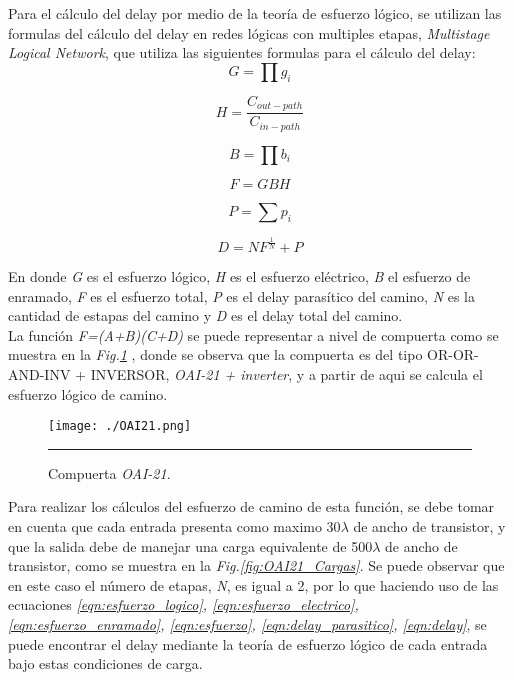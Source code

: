 \documentclass[12pt,a4paper]{article} %
\begin{document}
Para el cálculo del delay por medio de la teoría de esfuerzo lógico, se utilizan las formulas del cálculo del delay en redes lógicas con multiples etapas, \textit{Multistage Logical Network}, que utiliza las siguientes formulas para el cálculo del delay:\\

\begin{equation}\label{eqn:esfuerzo_logico}
G= \prod g_{i}
\end{equation}

\begin{equation}\label{eqn:esfuerzo_electrico}
H= \frac{C_{out-path}}{C_{in-path}}
\end{equation}

\begin{equation}\label{eqn:esfuerzo_enramado}
B= \prod b_{i}
\end{equation}

\begin{equation}\label{eqn:esfuerzo}
F = GBH
\end{equation}

\begin{equation}\label{eqn:delay_parasitico}
P = \sum p_{i}
\end{equation}

\begin{equation}\label{eqn:delay}
D = NF^{\frac{1}{N}} + P
\end{equation}

En donde \textit{G} es el esfuerzo lógico, \textit{H} es el esfuerzo eléctrico, \textit{B} el esfuerzo de enramado, \textit{F} es el esfuerzo total, \textit{P} es el delay parasítico del camino, \textit{N} es la cantidad de estapas del camino y \textit{D} es el delay total del camino.\\

La función \textit{F=(A+B)(C+D)} se puede representar a nivel de compuerta como se muestra en la \textit{Fig.\ref{fig:OAI21}} , donde se observa que la compuerta es del tipo OR-OR-AND-INV + INVERSOR, \textit{OAI-21 + inverter}, y a partir de aqui se calcula el esfuerzo lógico de camino.\\

\begin{figure}[htbp]
  \centering
    \texttt{[image: ./OAI21.png]}
    \rule{35em}{0.5pt}
  \caption[IdealvsSim]{Compuerta \textit{OAI-21}.}
  \label{fig:OAI21}
\end{figure}

Para realizar los cálculos del esfuerzo de camino de esta función, se debe tomar en cuenta que cada entrada presenta como maximo 30$\lambda$ de ancho de transistor, y que la salida debe de manejar una carga equivalente de 500$\lambda$ de ancho de transistor, como se muestra en la \textit{Fig.\ref{fig:OAI21_Cargas}}. Se puede observar que en este caso el número de etapas, \textit{N}, es igual a 2, por lo que haciendo uso de las ecuaciones \textit{\ref{eqn:esfuerzo_logico}, \ref{eqn:esfuerzo_electrico}, \ref{eqn:esfuerzo_enramado}, \ref{eqn:esfuerzo}, \ref{eqn:delay_parasitico}, \ref{eqn:delay}}, se puede encontrar el delay mediante la teoría de esfuerzo lógico de cada entrada bajo estas condiciones de carga.\\
\end{document}
